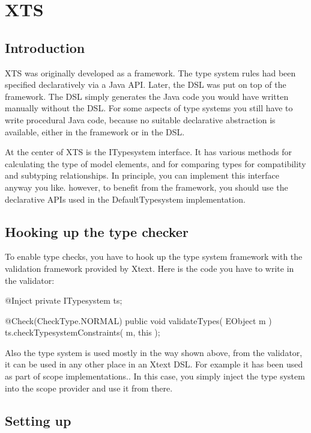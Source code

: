 \section{XTS}
\label{sec:xts}

\subsection{Introduction}

XTS was originally developed as a framework. The type system rules  had been
specified declaratively via a Java API. Later, the DSL was put on top of the
framework. The DSL simply generates the Java code you would have written
manually without the DSL. For some aspects of type systems you still have to
write procedural Java code, because no suitable declarative abstraction is
available, either in the framework or in the DSL.

At the center of XTS is the ITypesystem interface. It has various methods for
calculating the type of model elements, and for comparing types for
compatibility and subtyping relationships. In principle, you can implement this
interface anyway you like. however, to benefit from the framework, you should
use the declarative APIs used in the DefaultTypesystem implementation.

\subsection{Hooking up the type checker}

To enable type checks, you have to hook up the type system framework  with the
validation  framework provided by Xtext. Here is the code you have to write in
the validator:

\begin{code}
@Inject 
private ITypesystem ts;

@Check(CheckType.NORMAL)
public void validateTypes( EObject m ) {
    ts.checkTypesystemConstraints( m, this );
}    
\end{code}

Also the type system is used mostly in the way shown above, from the validator,
it can be used in any other place in an Xtext DSL. For example it has been used
as part of scope implementations.. In this case, you simply inject the type
system into the scope provider and use it from there.

\subsection{Setting up}

